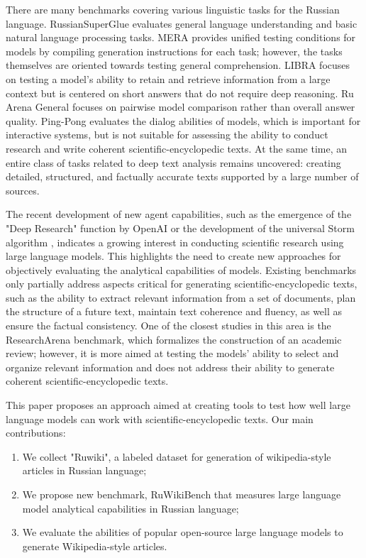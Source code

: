 \documentclass{superfri}
\begin{document}
There are many benchmarks covering various linguistic tasks for the Russian language. 
RussianSuperGlue \cite{rsglue} evaluates general language understanding and basic natural language processing tasks. 
MERA \cite{mera} provides unified testing conditions for models by compiling generation instructions for each task; however, the tasks themselves are oriented towards testing general comprehension. 
LIBRA \cite{libra} focuses on testing a model's ability to retain and retrieve information from a large context but is centered on short answers that do not require deep reasoning. 
Ru Arena General \cite{arena} focuses on pairwise model comparison rather than overall answer quality. 
Ping-Pong \cite{pp} evaluates the dialog abilities of models, which is important for interactive systems, 
but is not suitable for assessing the ability to conduct research and write coherent scientific-encyclopedic texts. 
At the same time, an entire class of tasks related to deep text analysis remains uncovered: creating detailed, structured, and factually accurate texts supported by a large number of sources.

The recent development of new agent capabilities, such as the emergence of the "Deep Research" function by OpenAI \cite{deepr} or the development of the universal Storm algorithm \cite{storm}, 
indicates a growing interest in conducting scientific research using large language models. 
This highlights the need to create new approaches for objectively evaluating the analytical capabilities of models. 
Existing benchmarks only partially address aspects critical for generating scientific-encyclopedic texts, 
such as the ability to extract relevant information from a set of documents, plan the structure of a future text, 
maintain text coherence and fluency, as well as ensure the factual consistency. One of the closest studies in this area is the ResearchArena \cite{resar} benchmark, 
which formalizes the construction of an academic review; however, it is more aimed at testing the models' ability 
to select and organize relevant information and does not address their ability to generate coherent scientific-encyclopedic texts.

This paper proposes an approach aimed at creating tools to test how well large language models can work with scientific-encyclopedic texts.
Our main contributions:
\begin{enumerate}
\item We collect "Ruwiki", a labeled dataset for generation of wikipedia-style articles in Russian language;
\item We propose new benchmark, RuWikiBench that measures large language model analytical capabilities in Russian language;
\item We evaluate the abilities of popular open-source large language models to generate Wikipedia-style articles.
\end{enumerate}
\end{document}
